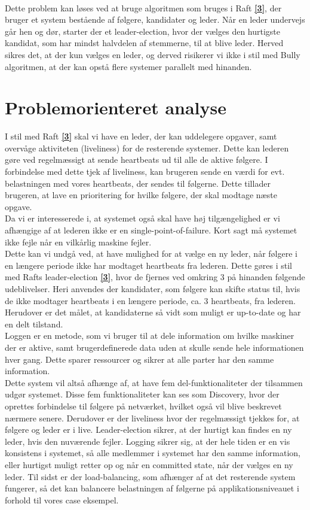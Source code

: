 \documentclass[a4paper,12pt]{article}
\begin{document}
\\[5px]
Dette problem kan løses ved at bruge algoritmen som bruges i Raft \hyperref[tre]{\textbf{[3]}}, der bruger et system bestående af følgere, kandidater og leder.
Når en leder undervejs går hen og dør, starter der et leader-election, hvor der vælges den hurtigste kandidat, som har mindst halvdelen af stemmerne, til at blive leder. Herved sikres det, at der kun vælges en leder, og derved risikerer vi ikke i stil med Bully algoritmen, at der kan opstå flere systemer parallelt med hinanden.
\newpage
  
\section{Problemorienteret analyse}
I stil med Raft \hyperref[tre]{\textbf{[3]}} skal vi have en leder, der kan uddelegere opgaver, samt overvåge aktiviteten (liveliness) for de resterende systemer. Dette kan lederen gøre ved regelmæssigt at sende heartbeats ud til alle de aktive følgere. I forbindelse med dette tjek af liveliness, kan brugeren sende en værdi for evt. belastningen med vores heartbeats, der sendes til følgerne. Dette tillader brugeren, at lave en prioritering for hvilke følgere, der skal modtage næste opgave.
\\
Da vi er interesserede i, at systemet også skal have høj tilgængelighed er vi afhængige af at lederen ikke er en single-point-of-failure. Kort sagt må systemet ikke fejle når en vilkårlig maskine fejler.
\\[5px]
Dette kan vi undgå ved, at have mulighed for at vælge en ny leder, når følgere i en længere periode ikke har modtaget heartbeats fra lederen. Dette gøres i stil med Rafts leader-election \hyperref[tre]{\textbf{[3]}}, hvor de fjernes ved omkring 3 på hinanden følgende udeblivelser. Heri anvendes der kandidater, som følgere kan skifte status til, hvis de ikke modtager heartbeats i en længere periode, ca. 3 heartbeats, fra lederen. Herudover er det målet, at kandidaterne så vidt som muligt er up-to-date og har en delt tilstand. 
\\
Loggen er en metode, som vi bruger til at dele information om hvilke maskiner der er aktive, samt brugerdefinerede data uden at skulle sende hele informationen hver gang. Dette sparer ressourcer og sikrer at alle parter har den samme information.
\\[5px]
Dette system vil altså afhænge af, at have fem del-funktionaliteter der tilsammen udgør systemet. Disse fem funktionaliteter kan ses som Discovery, hvor der oprettes forbindelse til følgere på netværket, hvilket også vil blive beskrevet nærmere senere. Derudover er der liveliness hvor der regelmæssigt tjekkes for, at følgere og leder er i live. Leader-election sikrer, at der hurtigt kan findes en ny leder, hvis den nuværende fejler. Logging sikrer sig, at der hele tiden er en vis konsistens i systemet, så alle medlemmer i systemet har den samme information, eller hurtigst muligt retter op og når en committed state, når der vælges en ny leder. Til sidst er der load-balancing, som afhænger af at det resterende system fungerer, så det kan balancere belastningen af følgerne på applikationsniveauet i forhold til vores case eksempel.
\end{document}
